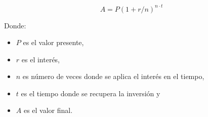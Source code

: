 \documentclass[12pt,letterpaper]{article}
\begin{document}

\[
  A = P(1 + r/n)^{n\cdot{}t}
\]

Donde:
\begin{itemize}
\item $P$ es el valor presente,
\item $r$ es el interés,
\item $n$ es número de veces donde se aplica el interés en el tiempo,
\item $t$ es el tiempo donde se recupera la inversión y
\item $A$ es el valor final.
\end{itemize}




\end{document}
